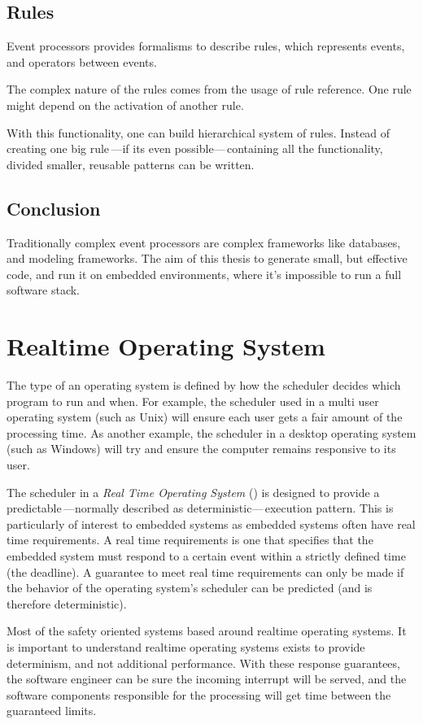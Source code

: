 \subsection{Rules}
\label{subsection:rules}
Event processors provides formalisms to describe rules, which represents events, and operators between events.

The complex nature of the rules comes from the usage of rule reference. One rule might depend on the activation of another rule.

With this functionality, one can build hierarchical system of rules. Instead of creating one big rule\,---if its even possible---\,containing all the functionality, divided smaller, reusable patterns can be written.

\subsection{Conclusion}

Traditionally complex event processors are complex frameworks like databases, and modeling frameworks. The aim of this thesis to generate small, but effective code, and run it on embedded environments, where it's impossible to run a full \cep software stack.

\section{Realtime Operating System}

The type of an operating system is defined by how the scheduler decides which program to run and when. For example, the scheduler used in a multi user operating system (such as Unix) will ensure each user gets a fair amount of the processing time. As another example, the scheduler in a desktop operating system (such as Windows) will try and ensure the computer remains responsive to its user.

The scheduler in a \emph{Real Time Operating System} (\rtos) is designed to provide a predictable\,---normally described as deterministic---\,execution pattern. This is particularly of interest to embedded systems as embedded systems often have real time requirements. A real time requirements is one that specifies that the embedded system must respond to a certain event within a strictly defined time (the deadline). A guarantee to meet real time requirements can only be made if the behavior of the operating system's scheduler can be predicted (and is therefore deterministic).\citep{RTOS}

Most of the safety oriented systems based around realtime operating systems. It is important to understand realtime operating systems exists to provide determinism, and not additional performance. With these response guarantees, the software engineer can be sure the incoming interrupt will be served, and the software components responsible for the processing will get \cpu time between the guaranteed limits.
